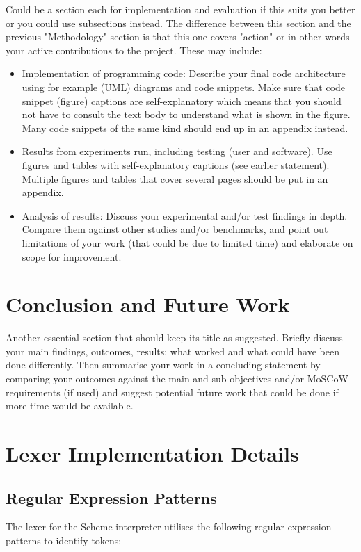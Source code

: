 \documentclass[final]{cmpreport_02}
\begin{document}
Could be a section each for implementation and evaluation if this suits you better or you could use subsections instead. The difference between this section and the previous "Methodology" section is that this one covers "action" or in other words your active contributions to the project. These may include:
\begin{itemize}
\item Implementation of programming code: Describe your final code architecture using for example (UML) diagrams and code snippets. Make sure that code snippet (figure) captions are self-explanatory which means that you should not have to consult the text body to understand what is shown in the figure. Many code snippets of the same kind should end up in an appendix instead.
\item Results from experiments run, including testing (user and software). Use figures and tables with self-explanatory captions (see earlier statement). Multiple figures and tables that cover several pages should be put in an appendix.
\item Analysis of results: Discuss your experimental and/or test findings in depth. Compare them against other studies and/or benchmarks, and point out limitations of your work (that could be due to limited time) and elaborate on scope for improvement.
\end{itemize}

\section{Conclusion and Future Work}

Another essential section that should keep its title as suggested. Briefly discuss your main findings, outcomes, results; what worked and what could have been done differently. Then summarise your work in a concluding statement by comparing your outcomes against the main and sub-objectives and/or MoSCoW requirements (if used) and suggest potential future work that could be done if more time would be available.


\clearpage



\appendix
\clearpage
\section{Lexer Implementation Details} \label{app:regex}

\subsection{Regular Expression Patterns}
The lexer for the Scheme interpreter utilises the following regular expression patterns to identify tokens:
\end{document}
